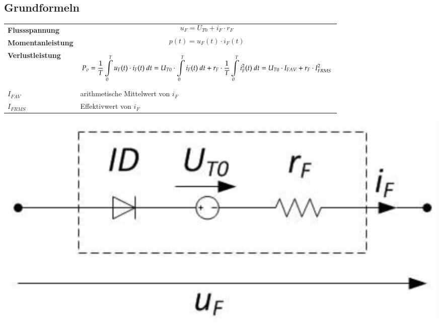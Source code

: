 \begin{multicols}{2}
\subsection{Grundformeln}
\begin{tabular}{ll}
    \textbf{Flussspannung}&\[ u_F = U_{T0} + i_F \cdot r_F \]\\[0.4cm]
    \textbf{Momentanleistung}&\[ p(t)=u_F(t)\cdot i_F(t) \]\\[0.4cm]
    \textbf{Verlustleistung}&\[ P_v= \frac{1}{T}\int_{0}^{T}\limits u_F(t)\cdot i_F(t)~dt = U_{T0}\cdot \int_{0}^{T}\limits i_F(t)~dt + r_F\cdot\frac{1}{T}\int_{0}^{T}\limits i^2_F(t)~dt = U_{T0}\cdot I_{FAV}+r_F\cdot I_{FRMS}^2 \]\\[0.2cm]
    $ I_{FAV}$ & \qquad arithmetische Mittelwert von $ i_F $\\
    $ I_{FRMS} $ & \qquad Effektivwert von $ i_F $\\    
\end{tabular}

\hspace{1cm}\vspace{-0.5cm}\includegraphics[width=0.6\linewidth]{images/ESBDiode} 
\end{multicols}


